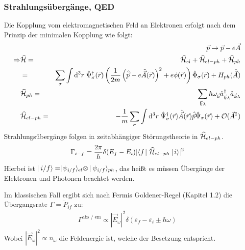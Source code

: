 \subsubsection{Strahlungsübergänge, QED}
Die Kopplung vom elektromagnetischen Feld an Elektronen erfolgt nach dem Prinzip der minimalen Kopplung wie folgt: 
\begin{eqnarray*}
&& \vec p \to \vec p-e\vec A
\\
\Rightarrow& \widehat{\mathcal H} =& \widehat{\mathcal H}_{el} + \widehat{\mathcal H}_{el-ph} + \widehat{\mathcal H}_{ph}
\\
&=& \sum_\sigma \int \mathrm{d}^3r \; \hat{\Psi}_\sigma^\dagger(\vec r) \left(\frac{1}{2m} \left(\hat{\vec{p}}-e\hat{\vec A}(\vec r)\right)^2 + e\phi(\vec r)\right) \hat{\Phi}_\sigma(\vec r) + H_{ph}(\hat{\vec{A}})
\\
& \widehat{\mathcal H}_{ph} =& \sum_{\vec k \lambda}\hbar \omega_{\vec k} \hat{a}^\dagger_{\vec k \lambda}\hat{a}_{\vec k \lambda}
\\
& \widehat{\mathcal H}_{el-ph} =& -\frac 1 m \sum_\sigma \int\mathrm{d}^3 r\; \hat{ \Psi}_\sigma^\dagger(\vec r) \hat{\vec A}(\vec{r})\hat{\vec{p}} \hat{\Psi}_\sigma(\vec{r}) + \mathcal{O}(\vec A^2)
\end{eqnarray*}
Strahlungsübergänge folgen in zeitabhängiger Störungstheorie in $\widehat{\mathcal H}_{el-ph}$.
\begin{eqnarray*}
\Gamma_{i-f} = \frac{2 \pi}\hbar \delta(E_f-E_i) |\langle{f}\!\!\!\,\,\mid\widehat{\mathcal H}_{el-ph}\mid\!\!\!\,\,{i}\rangle|^2
\end{eqnarray*}
Hierbei ist $\ket{i/f}=\ket{\psi_{i/f}}_{el}\otimes \ket{\psi_{i/f}}_{ph}$, das heißt es müssen Übergänge der Elektronen und Photonen beachtet werden.

Im klassischen Fall ergibt sich nach Fermis Goldener-Regel (Kapitel 1.2) die Übergangsrate $\Gamma=\dot{P}_{if}$ zu: 
\begin{eqnarray*}
\Gamma^{\text{abs / em}}\propto |\vec{E}_{\omega}|^2\delta(\varepsilon_f-\varepsilon_i \pm \hbar \omega)\end{eqnarray*}
Wobei $|\vec E_{\omega}|^2\propto n_{\omega}$ die Feldenergie ist, welche der Besetzung entspricht. 

